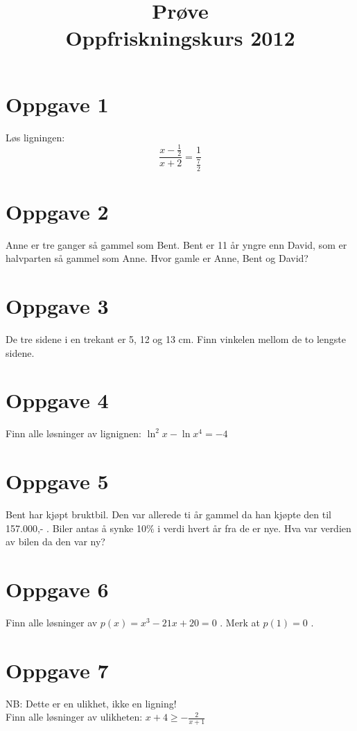 \documentclass [a4paper ,10 pt]{article}
\title { Pr\o ve\\ Oppfriskningskurs 2012}
\date {}
\begin{document}
\maketitle

\section{Oppgave 1}
L\o s ligningen:
\begin{equation*}
\frac{  x-\frac{1}{2}  }{x+2} = \frac{1}{\frac{7}{2}}
\end{equation*}

\section{Oppgave 2}
Anne er tre ganger s\aa \; gammel som Bent. Bent er 11 \aa r yngre enn David, som er halvparten s\aa \; gammel som Anne. Hvor gamle er Anne, Bent og David?

\section{Oppgave 3}
De tre sidene i en trekant er 5, 12 og 13 cm. Finn vinkelen mellom de to lengste sidene.

\section{Oppgave 4}
Finn alle l\o sninger av lignignen: $\ln^2 x - \ln x^4 = -4$

\section{Oppgave 5}
Bent har kj\o pt bruktbil. Den var allerede ti \aa r gammel da han kj\o pte den til 157.000,- . Biler antas \aa \; synke 10$\%$ i verdi hvert \aa r fra de er nye. Hva var verdien av bilen da den var ny?

\section{Oppgave 6}
Finn alle l\o sninger av $p(x) = x^3 - 21x + 20 = 0$ . Merk at $p(1) = 0$ .

\section{Oppgave 7}
NB: Dette er en ulikhet, ikke en ligning!\\
Finn alle l\o sninger av ulikheten: $x+4 \geq -\frac{2}{x+1}$ 
\end{document}
